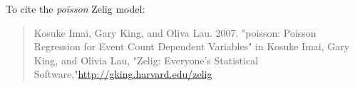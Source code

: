 To cite the \emph{ poisson } Zelig model:
 \begin{verse}
 Kosuke Imai, Gary King, and Oliva Lau. 2007. "poisson: Poisson Regression for Event Count Dependent Variables" in Kosuke Imai, Gary King, and Olivia Lau, "Zelig: Everyone's Statistical Software,"\url{http://gking.harvard.edu/zelig} 
\end{verse}
